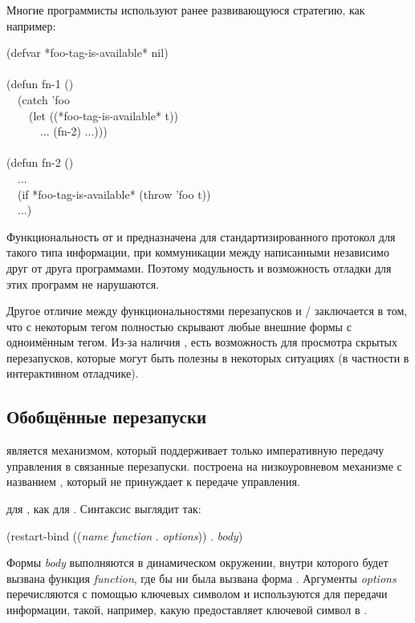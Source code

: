 Многие программисты используют ранее развивающуюся стратегию, как например:
\begin{lisp}
(defvar *foo-tag-is-available* nil) \\
\\
(defun fn-1 () \\
~~(catch 'foo \\
~~~~(let ((*foo-tag-is-available* t)) \\
~~~~~~... (fn-2) ...))) \\
\\
(defun fn-2 () \\
~~... \\
~~(if *foo-tag-is-available* (throw 'foo t)) \\
~~...)
\end{lisp}
Функциональность от  и  предназначена
для стандартизированного протокол для такого типа информации, при коммуникации
между написанными независимо друг от друга программами. Поэтому модульность и
возможность отладки для этих программ не нарушаются.

Другое отличие между функциональностями перезапусков и /
заключается в том, что  с некоторым тегом полностью скрывают любые
внешние формы  с одноимённым тегом. Из-за наличия
, есть возможность для просмотра скрытых перезапусков,
которые могут быть полезны в некоторых ситуациях (в частности в интерактивном
отладчике).

\subsection{Обобщённые перезапуски}
\label{LAST-RESTARTS-SECTION}

 является механизмом, который поддерживает только императивную
передачу управления в связанные перезапуски.  построена на
низкоуровневом механизме с названием , который не принуждает к
передаче управления.

 для , как  для
.
Синтаксис выглядит так:
\begin{lisp}
(restart-bind ((\emph{name} \emph{function} . \emph{options})) . \emph{body})
\end{lisp}
Формы \emph{body} выполняются в динамическом окружении, внутри которого будет
вызвана функция \emph{function}, где бы ни была вызвана форма
.
Аргументы \emph{options} перечисляются с помощью ключевых символом и
используются для передачи информации, такой, например, какую предоставляет
ключевой символ  в .

